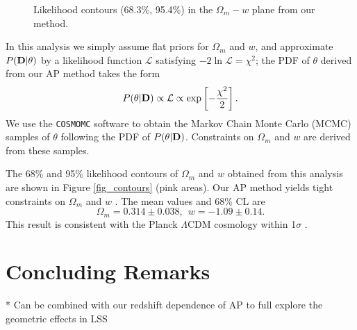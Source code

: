 \documentclass[iop]{emulateapj}
\begin{document}
\begin{figure}
   \centering{
   }
   \caption{\label{fig}
   Likelihood contours (68.3\%, 95.4\%) in the $\Omega_m-w$ plane from our method.
   }
\end{figure}

In this analysis we simply assume flat priors for $\Omega_m$ and $w$,
and approximate $P({\bf D}|{\bf \theta})$ by a likelihood function $\mathcal{L}$
satisfying  $-2 \ln \mathcal{L}=\chi^2$;
the PDF of $\theta$ derived from our AP method takes the form
\begin{equation}
 P({\bf \theta}|{\bf D}) \propto \mathcal{L} \propto \exp\left[-\frac{\chi^2}{2}\right].
\end{equation}
We use the {\texttt {COSMOMC}} software \citep{LB2002}
to obtain the Markov Chain Monte Carlo (MCMC) samples of $\theta$ following the PDF of $P({\bf \theta}|{\bf D})$.
Constraints on $\Omega_m$ and $w$ are derived from these samples.

The 68\% and 95\% likelihood contours of $\Omega_m$ and $w$ 
obtained from this analysis are shown in Figure \ref{fig_contours} (pink areas).
Our AP method yields tight constraints on $\Omega_m$ and $w$ .
The mean values and 68\% CL are
\begin{equation}
 \Omega_m=0.314 \pm 0.038,\ \ w = -1.09 \pm 0.14.
\end{equation}
This result is consistent with the Planck $\Lambda$CDM cosmology within 1$\sigma$ \citep{Planck2015}.







\section{Concluding Remarks}

 * Can be combined with our redshift dependence of AP to full explore the geometric effects in LSS
\end{document}

